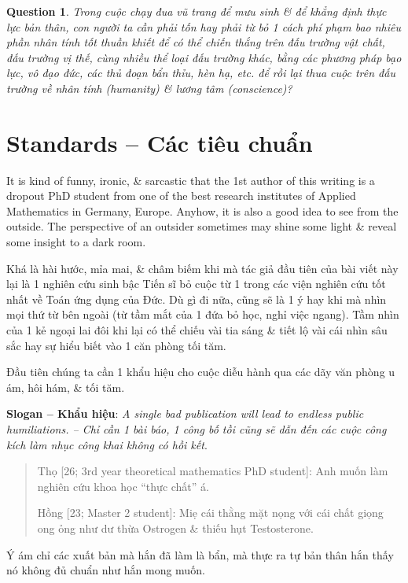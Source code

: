 \documentclass[12pt,oneside]{book}
\newtheorem{question}{Question}
\begin{document}
\begin{question}
	Trong cuộc chạy đua vũ trang để mưu sinh \& để khẳng định thực lực bản thân, con người ta cần phải tốn hay phải từ bỏ 1 cách phí phạm bao nhiêu phần nhân tính tốt thuần khiết để có thể chiến thắng trên đấu trường vật chất, đấu trường vị thế, cùng nhiều thể loại đấu trường khác, bằng các phương pháp bạo lực, vô đạo đức, các thủ đoạn bẩn thỉu, hèn hạ, etc. để rồi lại thua cuộc trên đấu trường về nhân tính (humanity) \& lương tâm (conscience)?
\end{question}

\section{Standards -- Các tiêu chuẩn}
It is kind of funny, ironic, \& sarcastic that the 1st author of this writing is a dropout PhD student from one of the best research institutes of Applied Mathematics in Germany, Europe. Anyhow, it is also a good idea to see from the outside. The perspective of an outsider sometimes may shine some light \& reveal some insight to a dark room.

Khá là hài hước, mỉa mai, \& châm biếm khi mà tác giả đầu tiên của bài viết này lại là 1 nghiên cứu sinh bậc Tiến sĩ bỏ cuộc từ 1 trong các viện nghiên cứu tốt nhất về Toán ứng dụng của Đức. Dù gì đi nữa, cũng sẽ là 1 ý hay khi mà nhìn mọi thứ từ bên ngoài (từ tầm mắt của 1 đứa bỏ học, nghỉ việc ngang). Tầm nhìn của 1 kẻ ngoại lai đôi khi lại có thể chiếu vài tia sáng \& tiết lộ vài cái nhìn sâu sắc hay sự hiểu biết vào 1 căn phòng tối tăm.

Đầu tiên chúng ta cần 1 khẩu hiệu cho cuộc diễu hành qua các dãy văn phòng u ám, hôi hám, \& tối tăm.

\vspace{2mm}
\noindent\textsf{{\bf Slogan -- Khẩu hiệu}}: {\it A single bad publication will lead to endless public humiliations. -- Chỉ cần 1 bài báo, 1 công bố tồi cũng sẽ dẫn đến các cuộc công kích làm nhục công khai không có hồi kết}.

\begin{quote}
	{\sf Thọ [26; 3rd year theoretical mathematics PhD student]}: Anh muốn làm nghiên cứu khoa học ``thực chất'' á.
	
	{\sf Hồng [23; Master 2 student]}: Miẹ cái thằng mặt nọng với cái chất giọng ong ỏng như dư thừa Ostrogen \& thiếu hụt Testosterone.
\end{quote}
Ý ám chỉ các xuất bản mà hắn đã làm là bẩn, mà thực ra tự bản thân hắn thấy nó không đủ chuẩn như hắn mong muốn.
\end{document}
